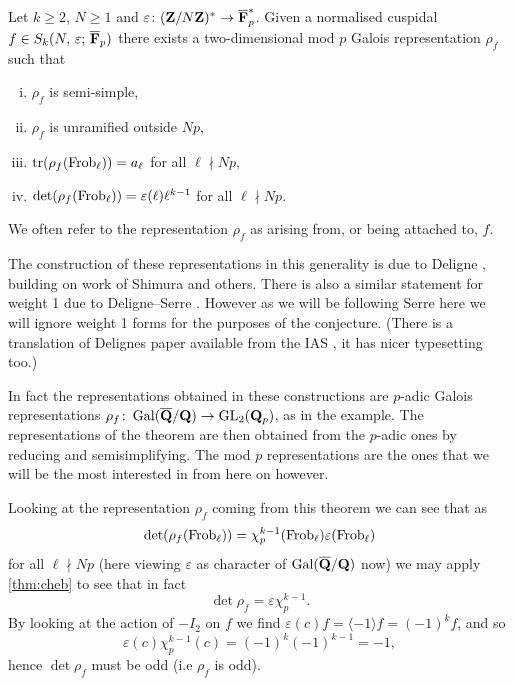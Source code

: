 \documentclass[a4paper,12pt]{article}
\begin{document}
\begin{thm}[Deligne]\label{thm:assoc}
Let $k \ge 2$, $N \ge 1$ and $\varepsilon\colon (\mathbf{Z}/N\mathbf{Z})^* \to \overline{\mathbf{F}}_p^*$. Given a normalised cuspidal $f\in S_k(N,\,\varepsilon;\,\overline{\mathbf{F}}_p)$ there exists a two-dimensional mod $p$ Galois representation $\rho_f$ such that
\begin{enumerate}[(i)]
\item $\rho_f$ is semi-simple,
\item $\rho_f$ is unramified outside $Np$,
\item $\operatorname{tr}(\rho_f (\operatorname{Frob}_\ell)) = a_\ell$ for all $\ell \nmid Np$,
\item $\det(\rho_f (\operatorname{Frob}_\ell)) = \varepsilon(\ell)\ell^{k-1}$ for all $\ell \nmid Np$.
\end{enumerate}
We often refer to the representation $\rho_f$ as arising from, or being attached to, $f$.
\end{thm}

The construction of these representations in this generality is due to Deligne \cite{Deligne}, building on work of Shimura and others.
There is also a similar statement for weight 1 due to Deligne--Serre \cite{DeligneSerre}.
However as we will be following Serre here we will ignore weight 1 forms for the purposes of the conjecture.
(There is a translation of Delignes paper available from the IAS \cite{DeligneEng}, it has nicer typesetting too.)

In fact the representations obtained in these constructions are $p$-adic Galois representations $\rho_f\colon \operatorname{Gal}(\overline{\mathbf{Q}}/\mathbf{Q}) \to \operatorname{GL}_2(\mathbf{Q}_p)$, as in the example.
The representations of the theorem are then obtained from the $p$-adic ones by reducing and semisimplifying.
The mod $p$ representations are the ones that we will be the most interested in from here on however.

\begin{rmk}\label{rmk:detrho}
Looking at the representation $\rho_f$ coming from this theorem we can see that as
\[
\det(\rho_f(\operatorname{Frob}_\ell)) = \chi_p^{k-1}(\operatorname{Frob}_\ell)\varepsilon(\operatorname{Frob}_\ell)
\]
for all $\ell \nmid Np$ (here viewing $\varepsilon$ as character of $\operatorname{Gal}(\overline{\mathbf{Q}}/\mathbf{Q})$ now) we may apply \cref{thm:cheb} to see that in fact
\[
\det\rho_f = \varepsilon\chi_p^{k-1}.
\]
By looking at the action of $-I_2$ on $f$ we find $\varepsilon(c)f = \langle -1 \rangle f = (-1)^k f$, and so
\[
\varepsilon(c)\chi_p^{k-1}(c) = (-1)^k(-1)^{k-1} = -1,
\]
hence $\det\rho_f$ must be odd (i.e $\rho_f$ is odd).
\end{rmk}
\end{document}
